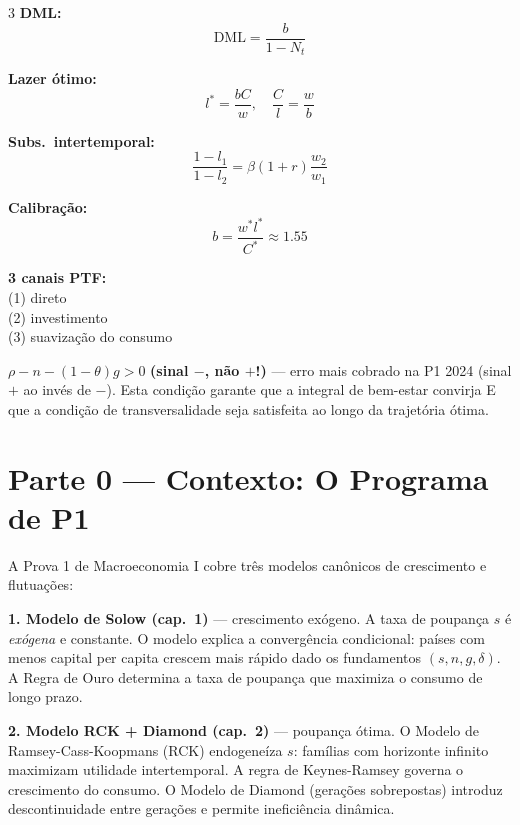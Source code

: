 \documentclass[12pt, a4paper]{article}
\begin{document}
\begin{multicols}{3}
\textbf{DML:}
\[
\text{DML} = \frac{b}{1-N_t}
\]

\textbf{Lazer ótimo:}
\[
l^* = \frac{bC}{w},\quad \frac{C}{l} = \frac{w}{b}
\]

\textbf{Subs.\ intertemporal:}
\[
\frac{1-l_1}{1-l_2} = \beta(1+r)\frac{w_2}{w_1}
\]

\textbf{Calibração:}
\[
b = \frac{w^* l^*}{C^*} \approx 1.55
\]

\textbf{3 canais PTF:}\\
(1) direto\\
(2) investimento\\
(3) suavização do consumo

\end{multicols}

\vspace{0.5em}
\begin{provabox}[title={Atenção --- Convergência e Transversalidade}]
$\rho - n - (1-\theta)g > 0$ \textbf{(sinal $-$, não $+$!)} --- erro mais cobrado na P1 2024 (sinal $+$ ao invés de $-$). Esta condição garante que a integral de bem-estar convirja E que a condição de transversalidade seja satisfeita ao longo da trajetória ótima.
\end{provabox}

\newpage
\tableofcontents
\newpage

\section*{Parte 0 --- Contexto: O Programa de P1}

A Prova 1 de Macroeconomia I cobre três modelos canônicos de crescimento e flutuações:

\textbf{1. Modelo de Solow (cap.\ 1)} --- crescimento exógeno. A taxa de poupança $s$ é \emph{exógena} e constante. O modelo explica a convergência condicional: países com menos capital per capita crescem mais rápido dado os fundamentos $(s,n,g,\delta)$. A Regra de Ouro determina a taxa de poupança que maximiza o consumo de longo prazo.

\textbf{2. Modelo RCK + Diamond (cap.\ 2)} --- poupança ótima. O Modelo de Ramsey-Cass-Koopmans (RCK) endogeneíza $s$: famílias com horizonte infinito maximizam utilidade intertemporal. A regra de Keynes-Ramsey governa o crescimento do consumo. O Modelo de Diamond (gerações sobrepostas) introduz descontinuidade entre gerações e permite ineficiência dinâmica.
\end{document}
